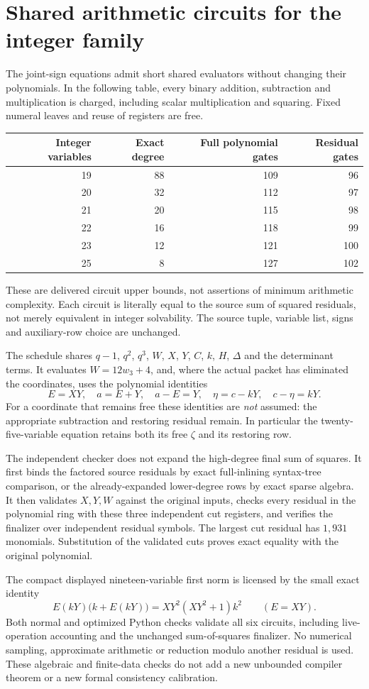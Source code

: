 \section{Shared arithmetic circuits for the integer family}
\label{sec:joint-circuits}

The joint-sign equations admit short shared evaluators without changing
their polynomials.  In the following table, every binary addition,
subtraction and multiplication is charged, including scalar multiplication
and squaring.  Fixed numeral leaves and reuse of registers are free.
\begin{center}
\begin{tabular}{rrrr}
Integer variables & Exact degree & Full polynomial gates & Residual gates\\\hline
19&88&109&96\\
20&32&112&97\\
21&20&115&98\\
22&16&118&99\\
23&12&121&100\\
25&8&127&102
\end{tabular}
\end{center}
These are delivered circuit upper bounds, not assertions of minimum
arithmetic complexity.  Each circuit is literally equal to the source
sum of squared residuals, not merely equivalent in integer solvability.
The source tuple, variable list, signs and auxiliary-row choice are unchanged.

The schedule shares $q-1$, $q^2$, $q^3$, $W$, $X$, $Y$, $C$, $k$,
$H$, $\Delta$ and the determinant terms.  It evaluates
$W=12w_3+4$, and, where the actual packet has eliminated the coordinates,
uses the polynomial identities
\[
 E=XY,\quad a=E+Y,\quad a-E=Y,\quad
 \eta=c-kY,\quad c-\eta=kY.
\]
For a coordinate that remains free these identities are \emph{not}
assumed: the appropriate subtraction and restoring residual remain.
In particular the twenty-five-variable equation retains both its free
$\zeta$ and its restoring row.

The independent checker does not expand the high-degree final sum of
squares.  It first binds the factored source residuals by exact full-inlining
syntax-tree comparison, or the already-expanded lower-degree rows by exact
sparse algebra.  It then validates $X,Y,W$ against the original inputs,
checks every residual in the polynomial ring with these three independent
cut registers, and verifies the finalizer over independent residual symbols.
The largest cut residual has $1{,}931$ monomials.  Substitution of the
validated cuts proves exact equality with the original polynomial.

The compact displayed nineteen-variable first norm is licensed by the
small exact identity
\[
 E(kY)\bigl(k+E(kY)\bigr)=XY^2(XY^2+1)k^2\qquad(E=XY).
\]
Both normal and optimized Python checks validate all six circuits, including
live-operation accounting and the unchanged sum-of-squares finalizer.
No numerical sampling, approximate arithmetic or reduction modulo another
residual is used.  These algebraic and finite-data checks do not add a new
unbounded compiler theorem or a new formal consistency calibration.
